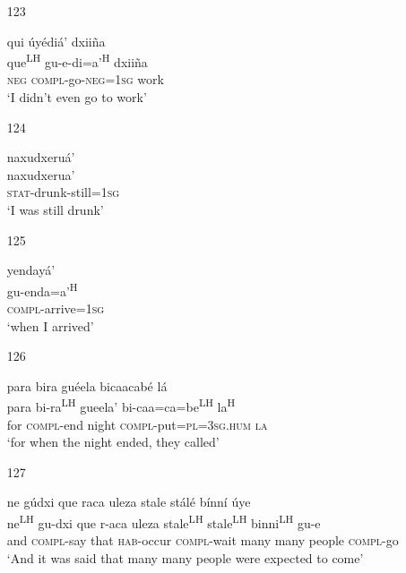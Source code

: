 \begin{itemize}
\item[123]
 
\glll  qui \'{u}y\'{e}di\'{a}' dxii\~{n}a  \\ 
que\textsuperscript{LH} gu-e-di=a'\textsuperscript{H} dxii\~{n}a  \\ 
\textsc{neg} \textsc{compl}-go-\textsc{neg}=\textsc{1sg} work \\
\glt `I didn't even go to work'
 


\item[124]
 
\glll   naxudxeru\'{a}'  \\
naxudxerua' \\
  \textsc{stat}-drunk-still=\textsc{1sg} \\
\glt `I was still drunk'
 


\item[125]
 
\glll   yenday\'{a}'  \\ 
gu-enda=a'\textsuperscript{H} \\
  \textsc{compl}-arrive=\textsc{1sg} \\
\glt `when I arrived'
 


\item[126]
  
\glll   para bira gu\'{e}ela bicaacab\'{e} l\'{a}  \\
para bi-ra\textsuperscript{LH} gueela' bi-caa=ca=be\textsuperscript{LH} la\textsuperscript{H} \\
for \textsc{compl}-end night \textsc{compl}-put=\textsc{pl}=\textsc{3sg.hum} \textsc{la} \\
\glt `for when the night ended, they called'
 


\item[127]
 
\glll  ne g\'{u}dxi que raca uleza stale st\'{a}l\'{e} b\'{i}nn\'{i} \'{u}ye \\
ne\textsuperscript{LH} gu-dxi que r-aca uleza stale\textsuperscript{LH} stale\textsuperscript{LH} binni\textsuperscript{LH} gu-e \\
and \textsc{compl}-say that \textsc{hab}-occur \textsc{compl}-wait many many people \textsc{compl}-go \\
\glt `And it was said that many many people were expected to come'
 




\end{itemize}
